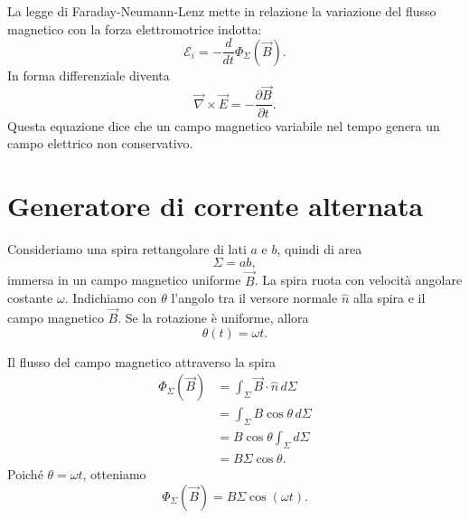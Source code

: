 \documentclass[a4paper]{article}
\begin{document}
La legge di Faraday-Neumann-Lenz mette in relazione la variazione del flusso magnetico con la forza elettromotrice indotta:
\[
\mathcal{E}_i=-\frac{d}{dt}\Phi_\Sigma(\vec{B}).
\]
In forma differenziale diventa
\[
\vec{\nabla}\times\vec{E}=-\frac{\partial \vec{B}}{\partial t}.
\]
Questa equazione dice che un campo magnetico variabile nel tempo genera un campo elettrico non conservativo.

\begin{center}
\end{center}

\section{Generatore di corrente alternata}

Consideriamo una spira rettangolare di lati \(a\) e \(b\), quindi di area
\[
\Sigma=ab,
\]
immersa in un campo magnetico uniforme \(\vec{B}\). La spira ruota con velocità angolare costante \(\omega\). Indichiamo con \(\theta\) l'angolo tra il versore normale \(\hat{n}\) alla spira e il campo magnetico \(\vec{B}\). Se la rotazione è uniforme, allora
\[
\theta(t)=\omega t.
\]

\begin{center}
\end{center}

Il flusso del campo magnetico attraverso la spira
\begin{align*}
\Phi_\Sigma(\vec{B})
&=\int_\Sigma \vec{B}\cdot\hat{n}\,d\Sigma \\
&=\int_\Sigma B\cos\theta\,d\Sigma \\
&=B\cos\theta\int_\Sigma d\Sigma \\
&=B\Sigma\cos\theta.
\end{align*}
Poiché \(\theta=\omega t\), otteniamo
\[
\Phi_\Sigma(\vec{B})=B\Sigma\cos(\omega t).
\]
\end{document}
